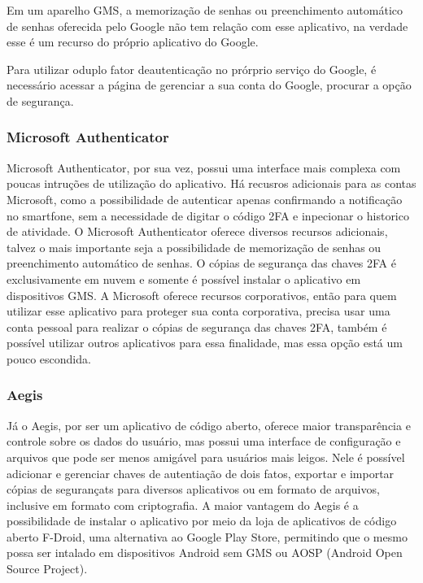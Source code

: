 \documentclass[12pt]{article}
\begin{document}
Em um aparelho GMS, a memorização de senhas ou preenchimento automático de
senhas oferecida pelo Google não tem relação com esse aplicativo, na verdade
esse é um recurso do próprio aplicativo do Google.

Para utilizar oduplo fator deautenticação no prórprio serviço do Google,
é necessário acessar a página de gerenciar a sua conta do Google, procurar
a opção de segurança.

\subsubsection{Microsoft Authenticator}

Microsoft Authenticator, por sua vez, possui uma interface mais complexa com
poucas intruções de utilização do aplicativo.
Há recusros adicionais para as contas Microsoft, como a possibilidade de
autenticar apenas confirmando a notificação no smartfone, sem a necessidade
de digitar o código 2FA e inpecionar o historico de atividade.
O Microsoft Authenticator oferece diversos recursos adicionais, talvez o mais
importante seja a possibilidade de memorização de senhas ou preenchimento
automático de senhas.
O cópias de segurança das chaves 2FA é exclusivamente em nuvem e somente é possível
instalar o aplicativo em dispositivos GMS.
A Microsoft oferece recursos corporativos, então para quem utilizar esse
aplicativo para proteger sua conta corporativa, precisa usar uma conta pessoal
para realizar o cópias de segurança das chaves 2FA, também é possível utilizar outros
aplicativos para essa finalidade, mas essa opção está um pouco escondida.

\subsubsection{Aegis}

Já o Aegis, por ser um aplicativo de código aberto, oferece maior transparência
e controle sobre os dados do usuário, mas possui uma interface de configuração
e arquivos que pode ser menos amigável para usuários mais leigos.
Nele é possível adicionar e gerenciar chaves de autentiação de dois fatos,
exportar e importar cópias de segurançats para diversos aplicativos ou em formato de arquivos,
inclusive em formato com criptografia.
A maior vantagem do Aegis é a possibilidade de instalar o aplicativo por meio da
loja de aplicativos de código aberto F-Droid, uma alternativa ao Google Play
Store, permitindo que o mesmo possa ser intalado em dispositivos Android sem GMS
ou AOSP (Android Open Source Project).
\end{document}
